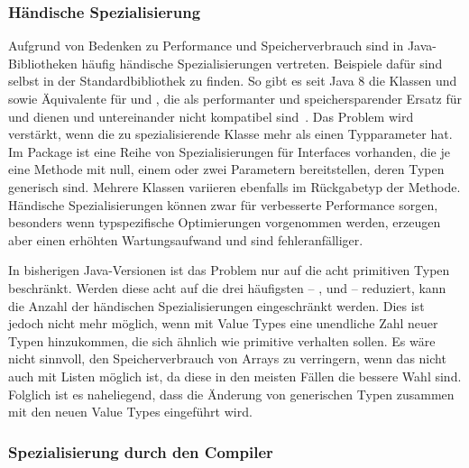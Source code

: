 \subsubsection{Händische Spezialisierung}

Aufgrund von Bedenken zu Performance und Speicherverbrauch sind in Java-Bibliotheken häufig händische Spezialisierungen vertreten.
Beispiele dafür sind selbst in der Standardbibliothek zu finden.
So gibt es seit Java 8 die Klassen  und  sowie Äquivalente für  und , die als performanter und speichersparender Ersatz für  und  dienen und untereinander nicht kompatibel sind~\cite{java-8-docs}.
Das Problem wird verstärkt, wenn die zu spezialisierende Klasse mehr als einen Typparameter hat.
Im Package  ist eine Reihe von Spezialisierungen für Interfaces vorhanden, die je eine Methode mit null, einem oder zwei Parametern bereitstellen, deren Typen generisch sind.
Mehrere Klassen variieren ebenfalls im Rückgabetyp der Methode.
Händische Spezialisierungen können zwar für verbesserte Performance sorgen, besonders wenn typspezifische Optimierungen vorgenommen werden, erzeugen aber einen erhöhten Wartungsaufwand und sind fehleranfälliger.

In bisherigen Java-Versionen ist das Problem nur auf die acht primitiven Typen beschränkt.
Werden diese acht auf die drei häufigsten -- ,  und  -- reduziert, kann die Anzahl der händischen Spezialisierungen eingeschränkt werden.
Dies ist jedoch nicht mehr möglich, wenn mit Value Types eine unendliche Zahl neuer Typen hinzukommen, die sich ähnlich wie primitive verhalten sollen.
Es wäre nicht sinnvoll, den Speicherverbrauch von Arrays zu verringern, wenn das nicht auch mit Listen möglich ist, da diese in den meisten Fällen die bessere Wahl sind.
Folglich ist es naheliegend, dass die Änderung von generischen Typen zusammen mit den neuen Value Types eingeführt wird.

\subsubsection{Spezialisierung durch den Compiler}

